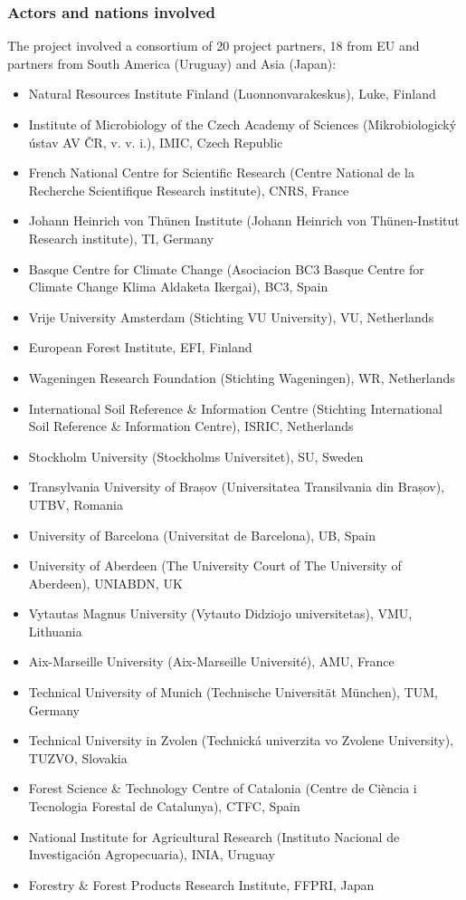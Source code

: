 \documentclass[12pt,a4paper]{article}
\begin{document}
\subsubsection{Actors and nations involved}
The project involved a consortium of 20 project partners, 18 from EU and partners from South America (Uruguay) and Asia (Japan):
\begin{itemize}
\item Natural Resources Institute Finland (Luonnonvarakeskus), Luke, Finland
\item Institute of Microbiology of the Czech Academy of Sciences (Mikrobiologický ústav AV ČR, v. v. i.), IMIC, Czech Republic
\item French National Centre for Scientific Research (Centre National de la Recherche Scientifique Research institute), CNRS, France
\item Johann Heinrich von Thünen Institute (Johann Heinrich von Thünen-Institut Research institute), TI, Germany
\item Basque Centre for Climate Change (Asociacion BC3 Basque Centre for Climate Change Klima Aldaketa Ikergai), BC3, Spain
\item Vrije University Amsterdam (Stichting VU University), VU, Netherlands
\item European Forest Institute, EFI, Finland
\item Wageningen Research Foundation (Stichting Wageningen), WR, Netherlands
\item International Soil Reference & Information Centre (Stichting International Soil Reference & Information Centre), ISRIC, Netherlands
\item Stockholm University (Stockholms Universitet), SU, Sweden
\item Transylvania University of Brașov (Universitatea Transilvania din Brașov), UTBV, Romania
\item University of Barcelona (Universitat de Barcelona), UB, Spain
\item University of Aberdeen (The University Court of The University of Aberdeen), UNIABDN, UK
\item Vytautas Magnus University (Vytauto Didziojo universitetas), VMU, Lithuania
\item Aix-Marseille University (Aix-Marseille Université), AMU, France
\item Technical University of Munich (Technische Universität München), TUM, Germany
\item Technical University in Zvolen (Technická univerzita vo Zvolene University), TUZVO, Slovakia
\item Forest Science \& Technology Centre of Catalonia (Centre de Ciència i Tecnologia Forestal de Catalunya), CTFC, Spain
\item National Institute for Agricultural Research (Instituto Nacional de Investigación Agropecuaria), INIA, Uruguay
\item Forestry \& Forest Products Research Institute, FFPRI, Japan
\end{itemize}
\end{document}
